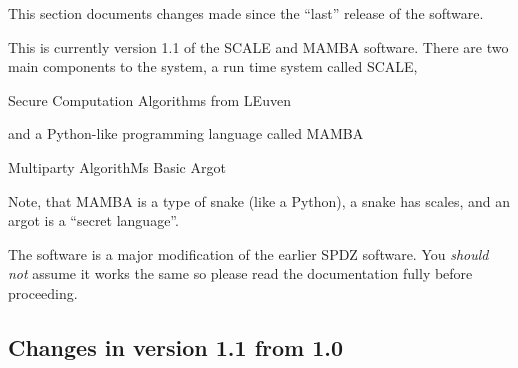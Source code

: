 
This section documents changes made since the ``last'' release of
the software. 

\vspace{5mm}

\noindent
This is currently version 1.1 of the SCALE and MAMBA software.
There are two main components to the system, a run time system called
SCALE,
\begin{center}
  Secure Computation Algorithms from LEuven
\end{center}
and a Python-like programming language called MAMBA
\begin{center}
  Multiparty AlgorithMs Basic Argot
\end{center}
Note, that MAMBA is a type of snake (like a Python), a snake
has scales, and an argot is a ``secret language''.

\vspace{5mm}

\noindent
The software is a major modification of the earlier SPDZ software. 
You {\em should not} assume it works the same so please read
the documentation fully before proceeding.

\subsection{Changes in version 1.1 from 1.0}

